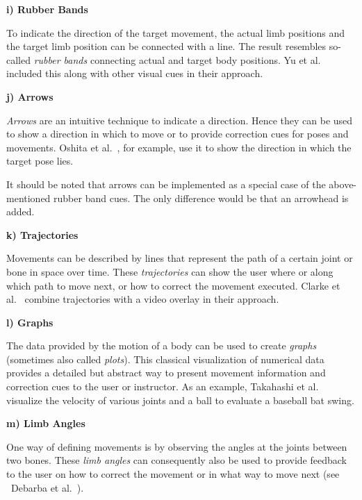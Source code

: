 \textbf{i) Rubber Bands}

To indicate the direction of the target movement, the actual limb positions and the target limb position can be connected with a line. The result resembles so-called \textit{rubber bands} connecting actual and target body positions. Yu et al.~\cite{yu2020pmd} included this along with other visual cues in their approach.

\textbf{j) Arrows}

\textit{Arrows} are an intuitive technique to indicate a direction. Hence they can be used to show a direction in which to move or to provide correction cues for poses and movements. Oshita et al.~\cite{oshita2018sts}, for example, use it to show the direction in which the target pose lies.

It should be noted that arrows can be implemented as a special case of the above-mentioned rubber band cues. The only difference would be that an arrowhead is added.

\textbf{k) Trajectories}

Movements can be described by lines that represent the path of a certain joint or bone in space over time. These \textit{trajectories} can show the user where or along which path to move next, or how to correct the movement executed. Clarke et al.~\cite{clarke2020rva} combine trajectories with a video overlay in their approach.

\textbf{l) Graphs}

The data provided by the motion of a body can be used to create \textit{graphs} (sometimes also called \emph{plots}). This classical visualization of numerical data provides a detailed but abstract way to present movement information and correction cues to the user or instructor. As an example, Takahashi et al.~\cite{takahashi2019vrb} visualize the velocity of various joints and a ball to evaluate a baseball bat swing.

\textbf{m) Limb Angles}

One way of defining movements is by observing the angles at the joints between two bones. These \textit{limb angles} can consequently also be used to provide feedback to the user on how to correct the movement or in what way to move next (see \eg\ Debarba et al.~\cite{debarba2018arv}).

